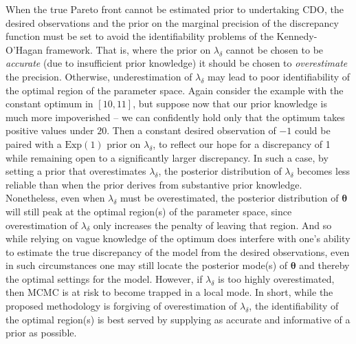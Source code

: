 \documentclass{article}
\begin{document}
When the true Pareto front cannot be estimated prior to undertaking CDO, %
the desired observations and the prior on the marginal precision of the discrepancy function must be set to avoid the identifiability problems of the Kennedy-O'Hagan framework.
%
That is, where the prior on $\lambda_\delta$ cannot be chosen to be \emph{accurate} (due to insufficient prior knowledge) it should be chosen to \emph{overestimate} the precision.
%
Otherwise, underestimation of $\lambda_\delta$ may lead to poor identifiability of the optimal region of the parameter space.
%
Again consider the example with the constant optimum in $[10,11]$, but suppose now that our prior knowledge is much more impoverished -- we can confidently hold only that the optimum takes positive values under $20$. 
%
Then a constant desired observation of $-1$ could be paired with a $\mathrm{Exp}(1)$ prior on $\lambda_\delta$, to reflect our hope for a discrepancy of 1 while remaining open to a significantly larger discrepancy.
%
In such a case, by setting a prior that overestimates $\lambda_\delta$, the posterior distribution of $\lambda_\delta$ becomes less reliable than when the prior derives from substantive prior knowledge.
%
Nonetheless, even when $\lambda_\delta$ must be overestimated, the posterior distribution of $\boldsymbol \theta$ will still peak at the optimal region(s) of the parameter space, since overestimation of $\lambda_\delta$ only increases the penalty of leaving that region.
%
And so while relying on vague knowledge of the optimum does interfere with one's ability to estimate the true discrepancy of the model from the desired observations, even in such circumstances one may still locate the posterior mode(s) of $\boldsymbol \theta$ and thereby the optimal settings for the model.
%
However, if $\lambda_\delta$ is too highly overestimated, then MCMC is at risk to become trapped in a local mode. 
%
In short, while the proposed methodology is forgiving of overestimation of $\lambda_\delta$, the identifiability of the optimal region(s) is best served by supplying as accurate and informative of a prior as possible. 
\end{document}
